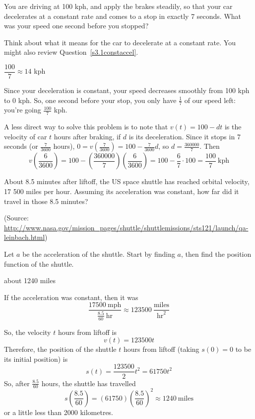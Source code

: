 \begin{question}
You are driving at 100 kph, and apply the brakes steadily, so that your car decelerates at a constant rate and comes to a stop in exactly 7 seconds. What was your speed one second before you stopped?
\end{question}
\begin{hint}
Think about what it means for the car to decelerate at a constant rate. You might also review Question~\ref{s3.1constaccel}.
\end{hint}
\begin{answer}
$\dfrac{100}{7}\approx 14$ kph
\end{answer}
\begin{solution}
Since your deceleration is constant, your speed decreases smoothly from 100 kph to 0 kph. So, one second before your stop, you only have $\frac{1}{7}$ of our speed left: you're going $\frac{100}{7}$ kph.

A less direct way to solve this problem is to note that $v(t)=100-dt$ is the velocity of car $t$ hours after braking, if $d$ is its deceleration. Since it stops in 7 seconds (or $\frac{7}{3600}$ hours), $0=v\left(\frac{7}{3600}\right)=100-\frac{7}{3600}d$, so $d=\frac{360000}{7}$.
Then \[v\left(\frac{6}{3600}\right)=100-\left(\frac{360000}{7}\right)\left(\frac{6}{3600}\right)=100-\frac{6}{7}\cdot100=\frac{100}{7}~\mathrm{kph}\]
\end{solution}

\begin{question}
About 8.5 minutes after liftoff, the US space shuttle has reached orbital velocity, 17 500 miles per hour. Assuming its acceleration was constant, how far did it travel in those 8.5 minutes?

(Source: {\scriptsize\url{http://www.nasa.gov/mission_pages/shuttle/shuttlemissions/sts121/launch/qa-leinbach.html}})
\end{question}
\begin{hint}
Let $a$ be the acceleration of the shuttle. Start by finding $a$, then find the position function of the shuttle.
\end{hint}
\begin{answer}
about 1240 miles
\end{answer}
\begin{solution}
If the acceleration was constant, then it was
\[\frac{17 500~\mathrm{mph}}{\frac{8.5}{60}~\mathrm{hr}} \approx 123 500 ~\frac{\mathrm{miles}}{\mathrm{hr}^2}\]

So, the velocity $t$ hours from liftoff is
\[v(t)=123500t\]
Therefore, the position of the shuttle $t$ hours from liftoff (taking $s(0)=0$ to be its initial position) is
\[s(t)=\frac{123500}{2}t^2=61750t^2\]
So, after $\frac{8.5}{60}$ hours, the shuttle has travelled
\[s\left(\frac{8.5}{60}\right)=(61750)\left(\frac{8.5}{60}\right)^2\approx 1240 ~\mathrm{miles}\]
or a little less than 2000 kilometres.
\end{solution}


